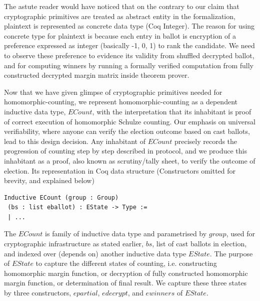 \documentclass{llncs}
\begin{document}
%
The astute reader would have noticed that on the contrary to our claim that 
cryptographic primitives are treated as abstract entity in the 
formalization, plaintext is represented as concrete data type (Coq Integer).
The reason for using concrete type for plaintext is because each 
entry in ballot is encryption of a preference expressed as integer 
(basically -1, 0, 1) to rank the candidate. 
We need to observe these preference to evidence its validity
from shuffled decrypted ballot, 
and  for computing winners by running a formally verified computation
from fully constructed decrypted margin matrix inside theorem prover.  
 
   
Now that we have given glimpse of cryptographic primitives needed for 
homomorphic-counting, we represent homomorphic-counting  as a 
dependent inductive data type, $ECount$, with the interpretation that its 
inhabitant is proof of correct execution of homomorphic Schulze counting. 
Our emphasis on  universal verifiability, where anyone can verify 
the election outcome based 
    on cast ballots, lead to this design decision. Any inhabitant 
    of $ECount$ precisely records the progression of counting step by step 
    described in protocol, and we 
    produce this inhabitant as a proof, also known as scrutiny/tally sheet, 
    to verify the outcome of election. Its 
representation in Coq data structure (Constructors omitted for brevity, 
and explained below)
\begin{verbatim}
Inductive ECount (group : Group) 
 (bs : list eballot) : EState -> Type :=
 | ... 
\end{verbatim}

The $ECount$ is family of inductive data type and 
parametrised by $group$, used for cryptographic 
infrastructure as stated earlier, 
$bs$, list of cast ballots in election, and indexed over (depends on)
 another inductive data type $EState$. 
 The purpose of $EState$ to capture the different states 
of counting, i.e. constructing homomorphic margin 
function, or decryption of fully constructed homomorphic margin function, or 
determination of final result. We capture these three states by 
 three constructors, $epartial$, $edecrypt$, and $ewinners$ of 
 $EState$.
\end{document}
